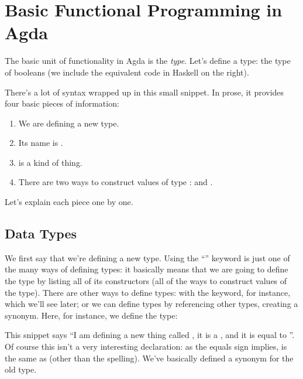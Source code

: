 \section{Basic Functional Programming in Agda}
The basic unit of functionality in Agda is the \emph{type}.
Let's define a type: the type of booleans (we include the equivalent code in
Haskell on the right).
\begin{agdalisting} \label{bool-def}
  \begin{multicols}{2} \centering
     \columnbreak
  \end{multicols}\vspace{-2\baselineskip}
\end{agdalisting}
There's a lot of syntax wrapped up in this small snippet.
In prose, it provides four basic pieces of information:
\begin{samepage}
\begin{enumerate}
  \item We are defining a new  type.
  \item Its name is .
  \item {} is a  kind of thing.
  \item There are two ways to construct values of type :
     and .
\end{enumerate}
\end{samepage}
Let's explain each piece one by one.

\subsection{Data Types}
We first say that we're defining a new  type.
Using the ``'' keyword is just one of the many ways of
defining types: it basically means that we are going to define the type by
listing all of its constructors (all of the ways to construct values of the
type).
There are other ways to define types: with the  keyword, for
instance, which we'll see later; or we can define types by referencing other
types, creating a synonym.
Here, for instance, we define the  type:
\begin{agdalisting*}
  \begin{multicols}{2} \centering
     \columnbreak
  \end{multicols}\vspace{-\baselineskip}
\end{agdalisting*}
This snippet says ``I am defining a new thing called , it
is a , and it is equal to ''.
Of course this isn't a very interesting declaration: as the equals sign implies,
 is the same as  (other than the
spelling).
We've basically defined a synonym for the old type.

